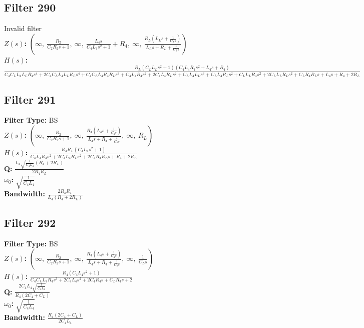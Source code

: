 \documentclass{article}
\begin{document}
\subsection*{Filter 290}
Invalid filter \\ 
\textbf{$Z(s)$:} $\left( \infty, \  \frac{R_{2}}{C_{2} R_{2} s + 1}, \  \infty, \  \frac{L_{4} s}{C_{4} L_{4} s^{2} + 1} + R_{4}, \  \infty, \  \frac{R_{L} \left(L_{L} s + \frac{1}{C_{L} s}\right)}{L_{L} s + R_{L} + \frac{1}{C_{L} s}}\right)$ \\ 
\textbf{$H(s)$:} $\frac{R_{L} \left(C_{L} L_{L} s^{2} + 1\right) \left(C_{4} L_{4} R_{4} s^{2} + L_{4} s + R_{4}\right)}{C_{4} C_{L} L_{4} L_{L} R_{4} s^{4} + 2 C_{4} C_{L} L_{4} L_{L} R_{L} s^{4} + C_{4} C_{L} L_{4} R_{4} R_{L} s^{3} + C_{4} L_{4} R_{4} s^{2} + 2 C_{4} L_{4} R_{L} s^{2} + C_{L} L_{4} L_{L} s^{3} + C_{L} L_{4} R_{L} s^{2} + C_{L} L_{L} R_{4} s^{2} + 2 C_{L} L_{L} R_{L} s^{2} + C_{L} R_{4} R_{L} s + L_{4} s + R_{4} + 2 R_{L}}$ \\ 
\subsection*{Filter 291}
\textbf{Filter Type:} BS \\ 
\textbf{$Z(s)$:} $\left( \infty, \  \frac{R_{2}}{C_{2} R_{2} s + 1}, \  \infty, \  \frac{R_{4} \left(L_{4} s + \frac{1}{C_{4} s}\right)}{L_{4} s + R_{4} + \frac{1}{C_{4} s}}, \  \infty, \  R_{L}\right)$ \\ 
\textbf{$H(s)$:} $\frac{R_{4} R_{L} \left(C_{4} L_{4} s^{2} + 1\right)}{C_{4} L_{4} R_{4} s^{2} + 2 C_{4} L_{4} R_{L} s^{2} + 2 C_{4} R_{4} R_{L} s + R_{4} + 2 R_{L}}$ \\ 
\textbf{Q:} $\frac{L_{4} \sqrt{\frac{1}{C_{4} L_{4}}} \left(R_{4} + 2 R_{L}\right)}{2 R_{4} R_{L}}$ \\ 
\textbf{$\omega_0$:} $\sqrt{\frac{1}{C_{4} L_{4}}}$ \\ 
\textbf{Bandwidth:} $\frac{2 R_{4} R_{L}}{L_{4} \left(R_{4} + 2 R_{L}\right)}$ \\ 
\subsection*{Filter 292}
\textbf{Filter Type:} BS \\ 
\textbf{$Z(s)$:} $\left( \infty, \  \frac{R_{2}}{C_{2} R_{2} s + 1}, \  \infty, \  \frac{R_{4} \left(L_{4} s + \frac{1}{C_{4} s}\right)}{L_{4} s + R_{4} + \frac{1}{C_{4} s}}, \  \infty, \  \frac{1}{C_{L} s}\right)$ \\ 
\textbf{$H(s)$:} $\frac{R_{4} \left(C_{4} L_{4} s^{2} + 1\right)}{C_{4} C_{L} L_{4} R_{4} s^{3} + 2 C_{4} L_{4} s^{2} + 2 C_{4} R_{4} s + C_{L} R_{4} s + 2}$ \\ 
\textbf{Q:} $\frac{2 C_{4} L_{4} \sqrt{\frac{1}{C_{4} L_{4}}}}{R_{4} \left(2 C_{4} + C_{L}\right)}$ \\ 
\textbf{$\omega_0$:} $\sqrt{\frac{1}{C_{4} L_{4}}}$ \\ 
\textbf{Bandwidth:} $\frac{R_{4} \left(2 C_{4} + C_{L}\right)}{2 C_{4} L_{4}}$ \\ 
\end{document}
